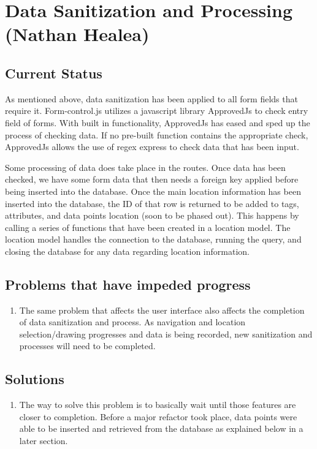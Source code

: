 \documentclass[letterpaper,10pt,titlepage, onecolumn, compsoc]{IEEEtran}
\begin{document}
\section{Data Sanitization and Processing (Nathan Healea)}
\subsection{Current Status}
As mentioned above, data sanitization has been applied to all form fields that require it. Form-control.js utilizes a javascript library ApprovedJs to check entry field of forms. With built in functionality, ApprovedJs has eased and sped up the process of checking data. If no pre-built function contains the appropriate check, ApprovedJs allows the use of regex express to check data that has been input.

Some processing of data does take place in the routes. Once data has been checked, we have some form data that then needs a foreign key applied before being inserted into the database. Once the main location information has been inserted into the database, the ID of that row is returned to be added to tags, attributes, and data points location (soon to be phased out). This happens by calling a series of functions that have been created in a location model. The location model handles the connection to the database, running the query, and closing the database for any data regarding location information. 

\subsection{Problems that have impeded progress}
\begin{enumerate}
	\item The same problem that affects the user interface also affects the completion of data sanitization and process. As navigation and location selection/drawing progresses and data is being recorded, new sanitization and processes will need to be completed.
\end{enumerate}

\subsection{Solutions}
\begin{enumerate}
	\item The way to solve this problem is to basically wait until those features are closer to completion. Before a major refactor took place, data points were able to be inserted and retrieved from the database as explained below in a later section.
\end{enumerate}
\end{document}
